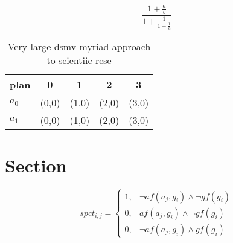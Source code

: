 \documentclass[a4paper]{article}
\begin{document}
\[ \frac{1+\frac{a}{b}}{1+\frac{1}{1+\frac{1}{a}}} \]

\begin{table}
\begin{adjustbox}{width=0.8\columnwidth}
\begin{tabular}{|l|l|l|l|l|}
\hline
\textbf{plan} & \multicolumn{1}{c|}{\textbf{0}} & \multicolumn{1}{c|}{\textbf{1}} & \multicolumn{1}{c|}{\textbf{2}} & \multicolumn{1}{c|}{\textbf{3}} \\ \hline
\textbf{$a_0$}  & (0,0) & (1,0) & (2,0) & (3,0) \\ \hline
\textbf{$a_1$}  & (0,0) & (1,0) & (2,0) & (3,0) \\ \hline
\end{tabular}
\end{adjustbox}
\caption{Very large dsmv myriad approach to scientiic rese
}
\end{table}

\section{Section}

\begin{equation}
spct_{i,j} =
\begin{cases}
1, & \text{$\neg af(a_j,g_i) \wedge \neg gf(g_i)$}\\
0, & \text{$af(a_j,g_i) \wedge \neg gf(g_i)$}\\
0, & \text{$\neg af(a_j,g_i) \wedge gf(g_i)$}
\end{cases}
\end{equation}
\end{document}
